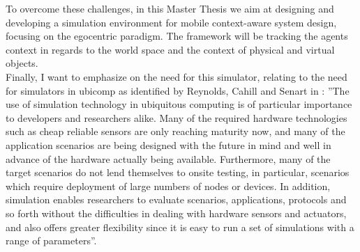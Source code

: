 To overcome these challenges, in this Master Thesis we aim at designing and developing a simulation environment for mobile context-aware system design, focusing on the egocentric paradigm. The framework will be tracking the agents context in regards to the world space and the context of physical and virtual objects.\\ 

Finally, I want to emphasize on the need for this simulator, relating to the need for simulators in ubicomp as identified by Reynolds, Cahill and Senart in \cite{reynolds2006requirements}: ''The use of simulation technology in ubiquitous computing is of particular importance to developers and researchers alike. Many of the required hardware technologies such as cheap reliable sensors are only reaching maturity now, and many of the application scenarios are being designed with the future in mind and well in advance of the hardware actually being available. Furthermore, many of the target scenarios do not lend themselves to onsite testing, in particular, scenarios which require deployment of large numbers of nodes or devices. In addition, simulation enables researchers to evaluate scenarios, applications, protocols and so forth without the difficulties in dealing with hardware sensors and actuators, and also offers greater flexibility since it is easy to run a set of simulations with a range of parameters''.\\









